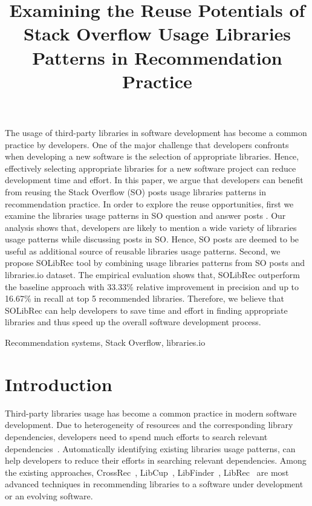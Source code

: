 \documentclass[paper]{ieice}
\title{Examining the Reuse Potentials of Stack Overflow Usage Libraries Patterns in Recommendation Practice}
\begin{document}
\maketitle
\begin{summary}

\noindent The usage of third-party libraries in software development has become a common practice by developers. One of the major challenge that developers confronts when developing a new software is the selection of appropriate libraries. Hence, effectively selecting appropriate libraries for a new software project can reduce development time and effort. In this paper, we argue that developers can benefit from reusing the Stack Overflow (SO) posts usage libraries patterns in recommendation practice.
In order to explore the reuse opportunities, first we examine the libraries usage patterns in SO question and answer posts . Our analysis shows that, developers are likely to mention a wide variety of libraries usage patterns while discussing posts in SO. Hence, SO posts are deemed to be useful as additional source of reusable libraries usage patterns. Second, we propose SOLibRec tool by combining usage libraries patterns from SO posts and libraries.io dataset. The empirical evaluation shows that, SOLibRec outperform the baseline approach with 33.33\% relative improvement in precision and up to 16.67\% in recall at top 5 recommended libraries. Therefore, we believe that SOLibRec can help developers to save time and effort in finding appropriate libraries and thus speed up the overall software development process.
\end{summary}
\begin{keywords}
Recommendation systems, Stack Overflow, libraries.io
\end{keywords}

\section{Introduction}
Third-party libraries usage has become a common practice in modern software development. Due to heterogeneity of resources and the corresponding library dependencies, developers need to spend much efforts to search relevant dependencies~\cite{robillard2009recommendation}. Automatically identifying existing libraries usage patterns, can help developers to reduce their efforts in searching relevant dependencies. Among the existing approaches, CrossRec~\cite{nguyen2020crossrec}, LibCup~\cite{saied2018improving}, LibFinder~\cite{ouni2017search}, LibRec~\cite{thung2013automated} are most advanced techniques in recommending libraries to a software under development or an evolving software. 
\end{document}
